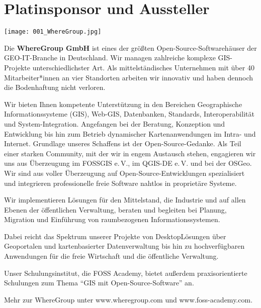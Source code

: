 \cleardoubleevenpage
\section*{Platinsponsor und Aussteller}
\begin{center}
  \centerline{\texttt{[image: 001\_WhereGroup.jpg]}}
\end{center}
\vspace*{-0.4cm}

\noindent
Die {\bfseries WhereGroup GmbH} ist eines der größten Open-Source-Soft\-ware\-häuser der GEO-IT-Branche in Deutschland. Wir managen zahlreiche komplexe GIS-Projekte unterschiedlichster Art. Als mittelständisches Unternehmen mit über 40 Mitarbeiter*innen an vier Standorten arbeiten wir innovativ und haben dennoch die Bodenhaftung nicht verloren.

\noindent
Wir bieten Ihnen kompetente Unterstützung in den Bereichen Geographische Informationssysteme (GIS), Web-GIS, Datenbanken, Standards, Interoperabilität und System-Integration. Angefangen bei der Beratung, Konzeption und Entwicklung bis hin zum Betrieb dynamischer Kartenanwendungen im Intra- und Internet.
\newpage
\noindent
Grundlage unseres Schaffens ist der Open-Source-Gedanke. Als Teil einer starken Community, mit der wir in engem Austausch stehen, engagieren wir uns aus Überzeugung im FOSSGIS e.\,V., im QGIS-DE e.\,V. und bei der OSGeo. Wir sind aus voller Überzeugung auf Open-Source-Entwicklungen spezialisiert und integrieren professionelle freie Software nahtlos in proprietäre Systeme.

\noindent
Wir implementieren Lösungen für den Mittelstand, die Industrie und auf allen Ebenen der öffentlichen Verwaltung, beraten und begleiten bei Planung, Migration und Einführung von raumbezogenen Informationssystemen.

\noindent
Dabei reicht das Spektrum unserer Projekte von Desktop\-Lösungen über Geoportalen und kartenbasierter Datenverwaltung bis hin zu hochverfügbaren Anwendungen für die freie Wirtschaft und die öffentliche Verwaltung.

\noindent
Unser Schulungsinstitut, die FOSS Academy, bietet außerdem praxisorientierte Schulungen zum Thema "`GIS mit Open-Source-Software"' an.

\noindent
Mehr zur WhereGroup unter www.wheregroup.com und www.foss-academy.com.


